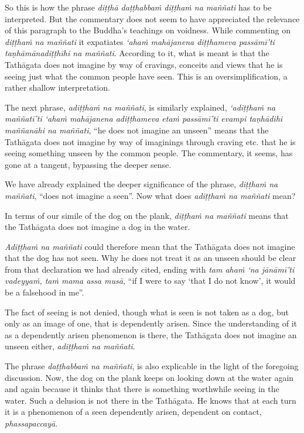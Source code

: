 So this is how the phrase \emph{diṭṭhā daṭṭhabbaṁ diṭṭhaṁ na maññati} has to be interpreted. But the commentary does not seem to have appreciated the relevance of this paragraph to the Buddha's teachings on voidness. While commenting on \emph{diṭṭhaṁ na maññati} it expatiates \emph{`ahaṁ mahājanena diṭṭhameva passāmī'ti taṇhāmānadiṭṭhīhi na maññati}. According to it, what is meant is that the Tathāgata does not imagine by way of cravings, conceits and views that he is seeing just what the common people have seen. This is an oversimplification, a rather shallow interpretation.

The next phrase, \emph{adiṭṭhaṁ na maññati}, is similarly explained, \emph{`adiṭṭhaṁ na maññatī'ti `ahaṁ mahājanena adiṭṭhameva etaṁ passāmī'ti evampi taṇhādihi maññanāhi na maññati}, ``he does not imagine an unseen'' means that the Tathāgata does not imagine by way of imaginings through craving etc. that he is seeing something unseen by the common people. The commentary, it seems, has gone at a tangent, bypassing the deeper sense.

We have already explained the deeper significance of the phrase, \emph{diṭṭhaṁ na maññati}, ``does not imagine a seen''. Now what does \emph{adiṭṭhaṁ na maññati} mean?

In terms of our simile of the dog on the plank, \emph{diṭṭhaṁ na maññati} means that the Tathāgata does not imagine a dog in the water.

\emph{Adiṭṭhaṁ na maññati} could therefore mean that the Tathāgata does not imagine that the dog has not seen. Why he does not treat it as an unseen should be clear from that declaration we had already cited, ending with \emph{tam ahaṁ `na jānāmī'ti vadeyyaṁ, taṁ mama assa musā,} ``if I were to say `that I do not know', it would be a falsehood in me''.

The fact of seeing is not denied, though what is seen is not taken as a dog, but only as an image of one, that is dependently arisen. Since the understanding of it as a dependently arisen phenomenon is there, the Tathāgata does not imagine an unseen either, \emph{adiṭṭhaṁ na maññati}.

The phrase \emph{daṭṭhabbaṁ na maññati}, is also explicable in the light of the foregoing discussion. Now, the dog on the plank keeps on looking down at the water again and again because it thinks that there is something worthwhile seeing in the water. Such a delusion is not there in the Tathāgata. He knows that at each turn it is a phenomenon of a seen dependently arisen, dependent on contact, \emph{phassapaccayā}.

